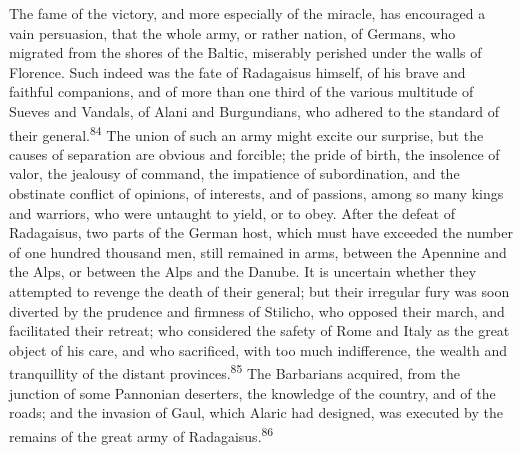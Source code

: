 The fame of the victory, and more especially of the miracle, has
encouraged a vain persuasion, that the whole army, or rather
nation, of Germans, who migrated from the shores of the Baltic,
miserably perished under the walls of Florence. Such indeed was
the fate of Radagaisus himself, of his brave and faithful
companions, and of more than one third of the various multitude
of Sueves and Vandals, of Alani and Burgundians, who adhered to
the standard of their general.\textsuperscript{84} The union of such an army might
excite our surprise, but the causes of separation are obvious and
forcible; the pride of birth, the insolence of valor, the
jealousy of command, the impatience of subordination, and the
obstinate conflict of opinions, of interests, and of passions,
among so many kings and warriors, who were untaught to yield, or
to obey. After the defeat of Radagaisus, two parts of the German
host, which must have exceeded the number of one hundred thousand
men, still remained in arms, between the Apennine and the Alps,
or between the Alps and the Danube. It is uncertain whether they
attempted to revenge the death of their general; but their
irregular fury was soon diverted by the prudence and firmness of
Stilicho, who opposed their march, and facilitated their retreat;
who considered the safety of Rome and Italy as the great object
of his care, and who sacrificed, with too much indifference, the
wealth and tranquillity of the distant provinces.\textsuperscript{85} The
Barbarians acquired, from the junction of some Pannonian
deserters, the knowledge of the country, and of the roads; and
the invasion of Gaul, which Alaric had designed, was executed by
the remains of the great army of Radagaisus.\textsuperscript{86}




